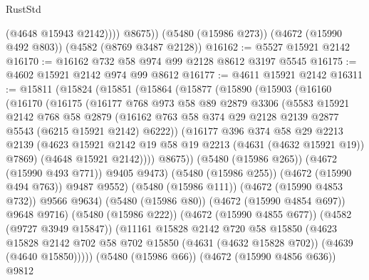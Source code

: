 \begin{lexlean}{RustStd}
\begin{coremodule}
              (@4648 @15943 @2142))))
        @8675))
    (@5480 (@15986 @273))
    (@4672 (@15990 @492 @803))
    (@4582 (@8769 @3487 @2128))
@16162 := @5527 @15921 @2142
@16170 := @16162 @732 @58 @974 @99 @2128 @8612 @3197 @5545
@16175 := @4602 @15921 @2142 @974 @99 @8612
@16177 := @4611 @15921 @2142
@16311 := @15811
    (@15824
      (@15851
        (@15864
          (@15877
            (@15890
              (@15903
                (@16160
                  (@16170
                    (@16175
                      (@16177
                        @768
                        @973
                        @58
                        @89
                        @2879
                        @3306
                        (@5583
                          @15921
                          @2142
                          @768
                          @58
                          @2879
                          (@16162
                            @763
                            @58
                            @374
                            @29
                            @2128
                            @2139
                            @2877
                            @5543
                            (@6215 @15921 @2142)
                            @6222))
                        (@16177
                          @396
                          @374
                          @58
                          @29
                          @2213
                          @2139
                          (@4623 @15921 @2142 @19 @58 @19 @2213 (@4631 (@4632 @15921 @19)) @7869)
                          (@4648 @15921 @2142))))
                    @8675))
                (@5480 (@15986 @265))
                (@4672 (@15990 @493 @771))
                @9405
                @9473)
              (@5480 (@15986 @255))
              (@4672 (@15990 @494 @763))
              @9487
              @9552)
            (@5480 (@15986 @111))
            (@4672 (@15990 @4853 @732))
            @9566
            @9634)
          (@5480 (@15986 @80))
          (@4672 (@15990 @4854 @697))
          @9648
          @9716)
        (@5480 (@15986 @222))
        (@4672 (@15990 @4855 @677))
        (@4582 (@9727 @3949 @15847))
        (@11161
          @15828
          @2142
          @720
          @58
          @15850
          (@4623
            @15828
            @2142
            @702
            @58
            @702
            @15850
            (@4631 (@4632 @15828 @702))
            (@4639 (@4640 @15850)))))
      (@5480 (@15986 @66))
      (@4672 (@15990 @4856 @636))
      @9812

\end{coremodule}
\end{lexlean}
